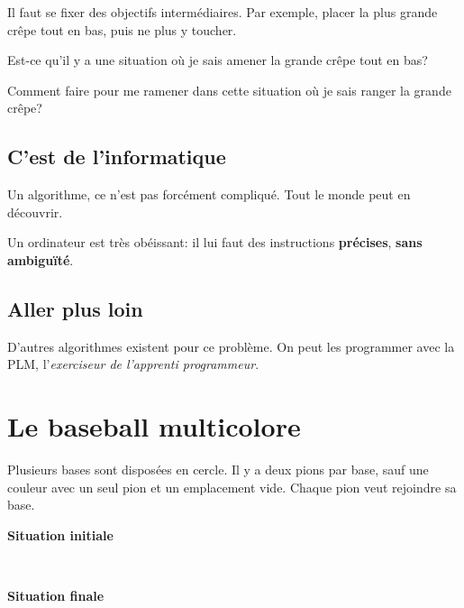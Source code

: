 \documentclass[a7paper,pagesize,DIV=14,10pt]{scrbook}
\begin{document}
Il faut se fixer des objectifs intermédiaires. Par exemple, placer la
plus grande crêpe tout en bas, puis ne plus y toucher.

\smallskip
Est-ce qu'il y a une situation où je sais amener la grande crêpe tout en bas?

\smallskip
Comment faire pour me ramener dans cette situation où je sais ranger la grande crêpe?

\subsection*{C'est de l'informatique}
\vspace{-.5\baselineskip}

Un algorithme, ce n'est pas forcément compliqué. Tout le monde peut en découvrir.

\smallskip
Un ordinateur est très obéissant: il lui faut des instructions
\textbf{précises}, \textbf{sans ambiguïté}.

\vspace{-.5\baselineskip}
\subsection*{Aller plus loin}
\vspace{-.5\baselineskip}
D'autres algorithmes existent pour ce problème. On peut les programmer
avec la PLM, l'\textit{exerciseur de l'apprenti programmeur}.%

\newpage
\section*{Le baseball multicolore}


\vspace{-.5\baselineskip} %
Plusieurs bases sont disposées en cercle.  Il y a deux pions par base,
sauf une couleur avec un seul pion et un emplacement vide.  Chaque
pion veut rejoindre sa base.

\begin{minipage}{.5\linewidth}\center
   {}

 \textbf{Situation initiale} 
\end{minipage}~
\begin{minipage}{.5\linewidth}\center

  \textbf{Situation finale}
\end{minipage}
\end{document}
